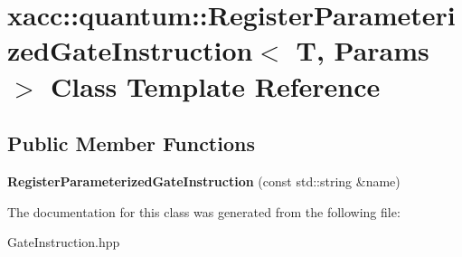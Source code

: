 \hypertarget{a01288}{}\section{xacc\+:\+:quantum\+:\+:Register\+Parameterized\+Gate\+Instruction$<$ T, Params $>$ Class Template Reference}
\label{a01288}
\subsection*{Public Member Functions}
\begin{DoxyCompactItemize}
\item 
\mbox{\label{a01288_a0dacd3a99b5ada1fc7bc81cbb59aefd3}} 
{\bfseries Register\+Parameterized\+Gate\+Instruction} (const std\+::string \&name)
\end{DoxyCompactItemize}


The documentation for this class was generated from the following file\+:\begin{DoxyCompactItemize}
\item 
Gate\+Instruction.\+hpp\end{DoxyCompactItemize}
